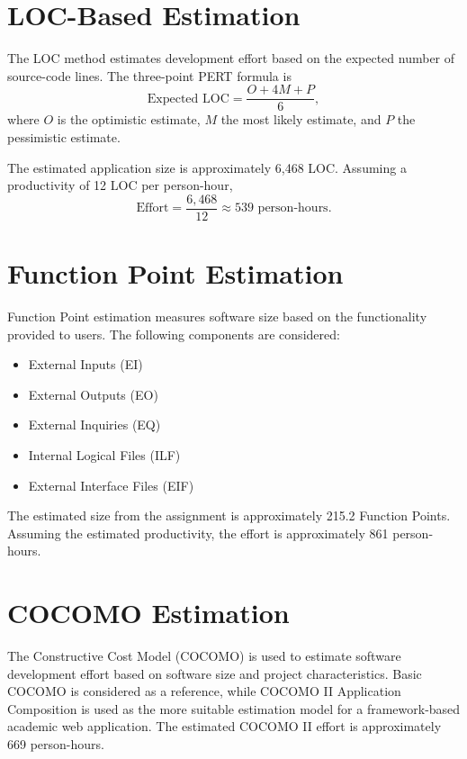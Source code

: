 \documentclass[11pt,a4paper]{article}
\begin{document}
\section{LOC-Based Estimation}
The LOC method estimates development effort based on the expected number of source-code lines. The three-point PERT formula is
\[
\text{Expected LOC} = \frac{O + 4M + P}{6},
\]
where $O$ is the optimistic estimate, $M$ the most likely estimate, and $P$ the pessimistic estimate.

The estimated application size is approximately 6,468 LOC. Assuming a productivity of 12 LOC per person-hour,
\[
\text{Effort} = \frac{6{,}468}{12} \approx 539 \text{ person-hours}.
\]

\section{Function Point Estimation}
Function Point estimation measures software size based on the functionality provided to users. The following components are considered:
\begin{itemize}
\item External Inputs (EI)
\item External Outputs (EO)
\item External Inquiries (EQ)
\item Internal Logical Files (ILF)
\item External Interface Files (EIF)
\end{itemize}
The estimated size from the assignment is approximately 215.2 Function Points. Assuming the estimated productivity, the effort is approximately 861 person-hours.

\section{COCOMO Estimation}
The Constructive Cost Model (COCOMO) is used to estimate software development effort based on software size and project characteristics. Basic COCOMO is considered as a reference, while COCOMO II Application Composition is used as the more suitable estimation model for a framework-based academic web application. The estimated COCOMO II effort is approximately 669 person-hours.
\end{document}
